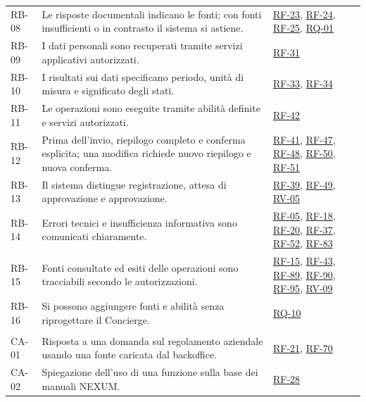 \documentclass[documento]{gpt}
\begin{document}
{\begin{longtable}{@{}p{2.6cm}>{\raggedright\arraybackslash}p{7.0cm}>{\raggedright\arraybackslash}p{5.2cm}@{}}
\mbox{RB-08} & Le risposte documentali indicano le fonti; con fonti insufficienti o in contrasto il sistema si astiene. & \hyperlink{req:RF-23}{RF-23}, \hyperlink{req:RF-24}{RF-24}, \hyperlink{req:RF-25}{RF-25}, \hyperlink{req:RQ-01}{RQ-01} \\
\mbox{RB-09} & I dati personali sono recuperati tramite servizi applicativi autorizzati. & \hyperlink{req:RF-31}{RF-31} \\
\mbox{RB-10} & I risultati sui dati specificano periodo, unità di misura e significato degli stati. & \hyperlink{req:RF-33}{RF-33}, \hyperlink{req:RF-34}{RF-34} \\
\mbox{RB-11} & Le operazioni sono eseguite tramite abilità definite e servizi autorizzati. & \hyperlink{req:RF-42}{RF-42} \\
\mbox{RB-12} & Prima dell'invio, riepilogo completo e conferma esplicita; una modifica richiede nuovo riepilogo e nuova conferma. & \hyperlink{req:RF-41}{RF-41}, \hyperlink{req:RF-47}{RF-47}, \hyperlink{req:RF-48}{RF-48}, \hyperlink{req:RF-50}{RF-50}, \hyperlink{req:RF-51}{RF-51} \\
\mbox{RB-13} & Il sistema distingue registrazione, attesa di approvazione e approvazione. & \hyperlink{req:RF-39}{RF-39}, \hyperlink{req:RF-49}{RF-49}, \hyperlink{req:RV-05}{RV-05} \\
\mbox{RB-14} & Errori tecnici e insufficienza informativa sono comunicati chiaramente. & \hyperlink{req:RF-05}{RF-05}, \hyperlink{req:RF-18}{RF-18}, \hyperlink{req:RF-20}{RF-20}, \hyperlink{req:RF-37}{RF-37}, \hyperlink{req:RF-52}{RF-52}, \hyperlink{req:RF-83}{RF-83} \\
\mbox{RB-15} & Fonti consultate ed esiti delle operazioni sono tracciabili secondo le autorizzazioni. & \hyperlink{req:RF-15}{RF-15}, \hyperlink{req:RF-43}{RF-43}, \hyperlink{req:RF-89}{RF-89}, \hyperlink{req:RF-90}{RF-90}, \hyperlink{req:RF-95}{RF-95}, \hyperlink{req:RV-09}{RV-09} \\
\mbox{RB-16} & Si possono aggiungere fonti e abilità senza riprogettare il Concierge. & \hyperlink{req:RQ-10}{RQ-10} \\
\addlinespace
\multicolumn{3}{@{}l}{\textbf{Criteri di accettazione del capitolato}} \\ \addlinespace[2pt]
\mbox{CA-01} & Risposta a una domanda sul regolamento aziendale usando una fonte caricata dal backoffice. & \hyperlink{req:RF-21}{RF-21}, \hyperlink{req:RF-70}{RF-70} \\
\mbox{CA-02} & Spiegazione dell'uso di una funzione sulla base dei manuali NEXUM. & \hyperlink{req:RF-28}{RF-28} \\

\end{longtable}}
\end{document}

